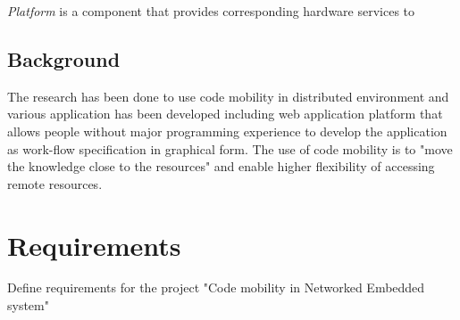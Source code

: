 \documentclass{scrreprt}
\begin{document}
\vspace{0.1in}
\noindent
\emph{Platform} is a component that provides corresponding hardware services to 

	\section{Background}

\noindent
The research has been done to use code mobility in distributed environment \cite{Bart1} and various application has been developed including \cite{Bart2} web application platform that allows people without major programming experience to develop the application as work-flow specification in graphical form. The use of code mobility is to "move the knowledge close to the resources" \cite{Picco} and enable higher flexibility of accessing remote resources.


\chapter{Requirements}	

Define requirements for the project "Code mobility in Networked Embedded system"

\renewcommand{\labelenumi}{\arabic{enumi}}
\renewcommand{\labelenumii}{\arabic{enumi}.\arabic{enumii}}
\end{document}
